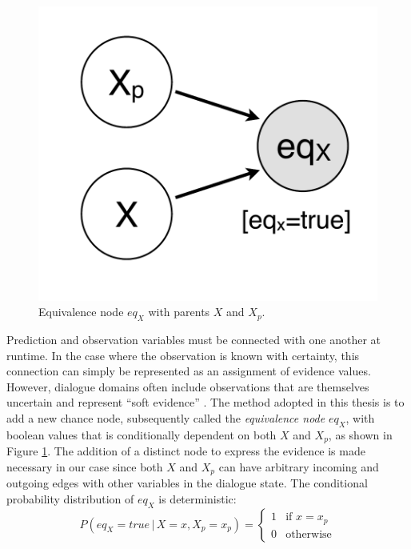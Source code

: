 \begin{figure}
\vspace{-6mm}
\centering
\includegraphics[scale=0.25]{imgs/prediction.pdf} 
\caption{Equivalence node $eq_{X}$ with parents $X$ and $X_p$.}
\label{fig:prediction}
\end{figure}

Prediction and observation variables must be connected with one another at runtime.  In the case where the observation is known with certainty, this connection can simply be represented as an assignment of evidence values.  However, dialogue domains often include observations that are themselves uncertain and represent ``soft evidence'' \citep{Pan06beliefupdate}.  The method adopted in this thesis is to add a new chance node, subsequently called the \textit{equivalence node} $eq_{X}$, with boolean values that is conditionally dependent on both $X$ and $X_p$, as shown in Figure \ref{fig:prediction}. The addition of a distinct node to express the evidence is made necessary in our case since both $X$ and $X_p$ can have arbitrary incoming and outgoing edges with other variables in the dialogue state.  The conditional probability distribution of $eq_X$ is deterministic:
\begin{equation}
P(eq_{X}\!=\!true \, | \, X\!=\!x, X_p\!=\!x_p) = \begin{cases}
1 & \text{if } x = x_p \\
0 & \text{otherwise}
\end{cases} \label{eq:equivdistrib}
\end{equation}

